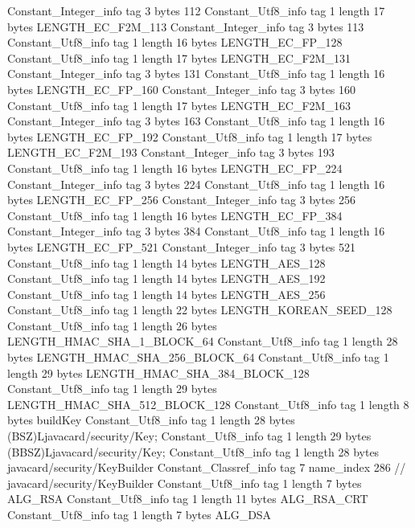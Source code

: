 {{{		}
		Constant_Integer_info {
			tag	3
			bytes	112
		}
		Constant_Utf8_info {
			tag	1
			length	17
			bytes	LENGTH_EC_F2M_113
		}
		Constant_Integer_info {
			tag	3
			bytes	113
		}
		Constant_Utf8_info {
			tag	1
			length	16
			bytes	LENGTH_EC_FP_128
		}
		Constant_Utf8_info {
			tag	1
			length	17
			bytes	LENGTH_EC_F2M_131
		}
		Constant_Integer_info {
			tag	3
			bytes	131
		}
		Constant_Utf8_info {
			tag	1
			length	16
			bytes	LENGTH_EC_FP_160
		}
		Constant_Integer_info {
			tag	3
			bytes	160
		}
		Constant_Utf8_info {
			tag	1
			length	17
			bytes	LENGTH_EC_F2M_163
		}
		Constant_Integer_info {
			tag	3
			bytes	163
		}
		Constant_Utf8_info {
			tag	1
			length	16
			bytes	LENGTH_EC_FP_192
		}
		Constant_Utf8_info {
			tag	1
			length	17
			bytes	LENGTH_EC_F2M_193
		}
		Constant_Integer_info {
			tag	3
			bytes	193
		}
		Constant_Utf8_info {
			tag	1
			length	16
			bytes	LENGTH_EC_FP_224
		}
		Constant_Integer_info {
			tag	3
			bytes	224
		}
		Constant_Utf8_info {
			tag	1
			length	16
			bytes	LENGTH_EC_FP_256
		}
		Constant_Integer_info {
			tag	3
			bytes	256
		}
		Constant_Utf8_info {
			tag	1
			length	16
			bytes	LENGTH_EC_FP_384
		}
		Constant_Integer_info {
			tag	3
			bytes	384
		}
		Constant_Utf8_info {
			tag	1
			length	16
			bytes	LENGTH_EC_FP_521
		}
		Constant_Integer_info {
			tag	3
			bytes	521
		}
		Constant_Utf8_info {
			tag	1
			length	14
			bytes	LENGTH_AES_128
		}
		Constant_Utf8_info {
			tag	1
			length	14
			bytes	LENGTH_AES_192
		}
		Constant_Utf8_info {
			tag	1
			length	14
			bytes	LENGTH_AES_256
		}
		Constant_Utf8_info {
			tag	1
			length	22
			bytes	LENGTH_KOREAN_SEED_128
		}
		Constant_Utf8_info {
			tag	1
			length	26
			bytes	LENGTH_HMAC_SHA_1_BLOCK_64
		}
		Constant_Utf8_info {
			tag	1
			length	28
			bytes	LENGTH_HMAC_SHA_256_BLOCK_64
		}
		Constant_Utf8_info {
			tag	1
			length	29
			bytes	LENGTH_HMAC_SHA_384_BLOCK_128
		}
		Constant_Utf8_info {
			tag	1
			length	29
			bytes	LENGTH_HMAC_SHA_512_BLOCK_128
		}
		Constant_Utf8_info {
			tag	1
			length	8
			bytes	buildKey
		}
		Constant_Utf8_info {
			tag	1
			length	28
			bytes	(BSZ)Ljavacard/security/Key;
		}
		Constant_Utf8_info {
			tag	1
			length	29
			bytes	(BBSZ)Ljavacard/security/Key;
		}
		Constant_Utf8_info {
			tag	1
			length	28
			bytes	javacard/security/KeyBuilder
		}
		Constant_Classref_info {
			tag	7
			name_index	286		// javacard/security/KeyBuilder
		}
		Constant_Utf8_info {
			tag	1
			length	7
			bytes	ALG_RSA
		}
		Constant_Utf8_info {
			tag	1
			length	11
			bytes	ALG_RSA_CRT
		}
		Constant_Utf8_info {
			tag	1
			length	7
			bytes	ALG_DSA
}}}
